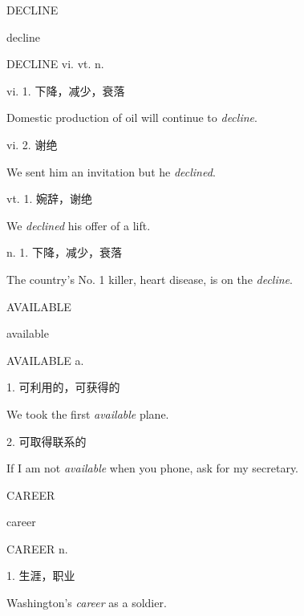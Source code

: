 \begin{flashcard}{
DECLINE

decline
}
\begin{center}
DECLINE vi. vt. n. 
\end{center}
vi. 1. 下降，减少，衰落

Domestic production of oil will continue to \textit{decline}.

vi. 2. 谢绝

We sent him an invitation but he \textit{declined}.

vt. 1. 婉辞，谢绝

We \textit{declined} his offer of a lift.

n. 1. 下降，减少，衰落

The country's No. 1 killer, heart disease, is on the \textit{decline}.

\end{flashcard}
\begin{flashcard}{
AVAILABLE

available
}
\begin{center}
AVAILABLE a. 
\end{center}
1. 可利用的，可获得的

We took the first \textit{available} plane.

2. 可取得联系的

If I am not \textit{available} when you phone, ask for my secretary.

\end{flashcard}
\begin{flashcard}{
CAREER

career
}
\begin{center}
CAREER n. 
\end{center}
1. 生涯，职业

Washington's \textit{career} as a soldier.

\end{flashcard}
